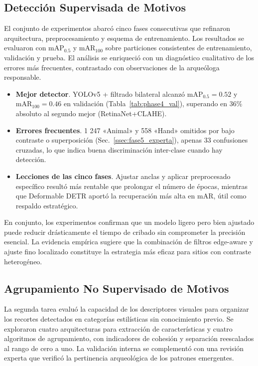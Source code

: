 \subsection{Detección Supervisada de Motivos}

El conjunto de experimentos abarcó cinco fases consecutivas que refinaron arquitectura, preprocesamiento y esquema de entrenamiento.
Los resultados se evaluaron con \(\mathrm{mAP}_{0.5}\) y \(\mathrm{mAR}_{100}\) sobre particiones consistentes de entrenamiento, validación y prueba.
El análisis se enriqueció con un diagnóstico cualitativo de los errores más frecuentes, contrastado con observaciones de la arqueóloga responsable.

\begin{itemize}
  \item \textbf{Mejor detector}.  YOLOv5 + filtrado bilateral alcanzó
        \(\mathrm{mAP}_{0.5}=0.52\) y \(\mathrm{mAR}_{100}=0.46\)
        en validación (Tabla~\ref{tab:phase4_val}), superando en
        36\% absoluto al segundo mejor (RetinaNet+CLAHE).
  \item \textbf{Errores frecuentes}.  1 247 «Animal» y 558 «Hand»
        omitidos por bajo contraste o superposición (Sec.~\ref{ssec:fase5_experta}),
        apenas 33 confusiones cruzadas, lo que indica buena discriminación
        inter-clase cuando hay detección.
  \item \textbf{Lecciones de las cinco fases}.
        Ajustar anclas y aplicar preprocesado específico resultó más rentable
        que prolongar el número de épocas, mientras que Deformable DETR aportó
        la recuperación más alta en \(\mathrm{mAR}\), útil como respaldo estratégico.
\end{itemize}

En conjunto, los experimentos confirman que un modelo ligero pero bien ajustado puede reducir drásticamente el tiempo de cribado sin comprometer la precisión esencial.
La evidencia empírica sugiere que la combinación de filtros edge-aware y ajuste fino localizado constituye la estrategia más eficaz para sitios con contraste heterogéneo.

\subsection{Agrupamiento No Supervisado de Motivos}

La segunda tarea evaluó la capacidad de los descriptores visuales para organizar los recortes detectados en categorías estilísticas sin conocimiento previo.
Se exploraron cuatro arquitecturas para extracción de características y cuatro algoritmos de agrupamiento, con indicadores de cohesión y separación reescalados al rango de cero a uno.
La validación interna se complementó con una revisión experta que verificó la pertinencia arqueológica de los patrones emergentes.

